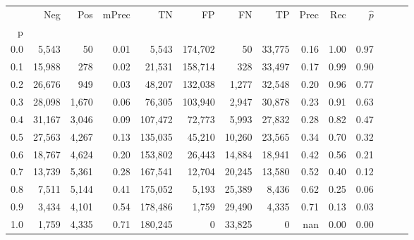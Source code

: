 \begin{tabular}{rrrrrrrrrrrrrr}
\toprule
{} &     Neg &    Pos & mPrec &       TN &       FP &      FN &      TP &  Prec &   Rec & $\hat{p}$ \\
p   &         &        &       &          &          &         &         &       &       &           \\
\midrule
0.0 &   5,543 &     50 &  0.01 &    5,543 &  174,702 &      50 &  33,775 &  0.16 &  1.00 &      0.97 \\
0.1 &  15,988 &    278 &  0.02 &   21,531 &  158,714 &     328 &  33,497 &  0.17 &  0.99 &      0.90 \\
0.2 &  26,676 &    949 &  0.03 &   48,207 &  132,038 &   1,277 &  32,548 &  0.20 &  0.96 &      0.77 \\
0.3 &  28,098 &  1,670 &  0.06 &   76,305 &  103,940 &   2,947 &  30,878 &  0.23 &  0.91 &      0.63 \\
0.4 &  31,167 &  3,046 &  0.09 &  107,472 &   72,773 &   5,993 &  27,832 &  0.28 &  0.82 &      0.47 \\
0.5 &  27,563 &  4,267 &  0.13 &  135,035 &   45,210 &  10,260 &  23,565 &  0.34 &  0.70 &      0.32 \\
0.6 &  18,767 &  4,624 &  0.20 &  153,802 &   26,443 &  14,884 &  18,941 &  0.42 &  0.56 &      0.21 \\
0.7 &  13,739 &  5,361 &  0.28 &  167,541 &   12,704 &  20,245 &  13,580 &  0.52 &  0.40 &      0.12 \\
0.8 &   7,511 &  5,144 &  0.41 &  175,052 &    5,193 &  25,389 &   8,436 &  0.62 &  0.25 &      0.06 \\
0.9 &   3,434 &  4,101 &  0.54 &  178,486 &    1,759 &  29,490 &   4,335 &  0.71 &  0.13 &      0.03 \\
1.0 &   1,759 &  4,335 &  0.71 &  180,245 &        0 &  33,825 &       0 &   nan &  0.00 &      0.00 \\
\bottomrule
\end{tabular}
